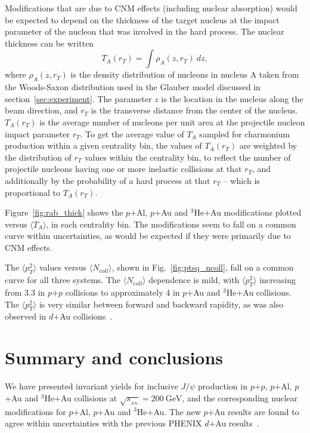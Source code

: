 \documentclass[twocolumn,letterpaper,aps,prc,longbibliography,superscriptaddress,nofootinbib,floatfix]{revtex4-1}
\newcommand{\meanncoll}{\mbox{$\langle N_{\mathrm coll} \rangle$}\xspace}
\newcommand{\meanptsq}{\mbox{$\langle p_T^2 \rangle$}\xspace}
\newcommand{\sqsntwo}{\mbox{$\sqrt{s_{_{NN}}}=200~\mathrm{GeV}$}\xspace}
\newcommand{\pp}{\mbox{$p$$+$$p$}\xspace}
\newcommand{\dau}{\mbox{$d$$+$Au}\xspace}
\newcommand{\pau}{\mbox{$p$$+$Au}\xspace}
\newcommand{\pal}{\mbox{$p$$+$Al}\xspace}
\newcommand{\heau}{\mbox{$^{3}$He$+$Au}\xspace}
\newcommand{\jpsi}{\mbox{$J/\psi$}\xspace}
\begin{document}
Modifications that are due to CNM effects (including nuclear absorption) 
would be expected to depend on the thickness of the target nucleus at 
the impact parameter of the nucleon that was involved in the hard 
process. The nuclear thickness can be written
\begin{equation}
    T_{A}(r_{T}) = \int  \rho_{A}(z, r_{T}) ~ dz,
\end{equation}
where $\rho_A(z, r_T)$ is the density distribution of nucleons in 
nucleus A taken from the Woods-Saxon distribution used in the Glauber 
model discussed in section~\ref{sec:experiment}. The parameter $z$ is 
the location in the nucleus along the beam direction, and $r_T$ is the 
transverse distance from the center of the nucleus. $T_A(r_T)$ is the 
average number of nucleons per unit area at the projectile nucleon 
impact parameter $r_T$. To get the average value of $T_A$ sampled for 
charmonium production within a given centrality bin, the values of 
$T_A(r_T)$ are weighted by the distribution of $r_T$ values within the 
centrality bin, to reflect the number of projectile nucleons having one 
or more inelastic collisions at that $r_T$, and additionally by the 
probability of a hard process at that $r_T$ -- which is proportional to 
$T_A(r_T)$.

Figure~\ref{fig:rab_thick} shows the \pal, \pau and \heau modifications 
plotted versus $\langle T_{A}\rangle$, in each centrality bin. The 
modifications seem to fall on a common curve within uncertainties, as 
would be expected if they were primarily due to CNM effects.

The \meanptsq values versus \meanncoll, shown in 
Fig.~\ref{fig:ptsq_ncoll}, fall on a common curve for all three systems. 
The \meanncoll dependence is mild, with \meanptsq increasing from 3.3 in 
\pp collisions to approximately 4 in \pau and \heau collisions. The 
\meanptsq is very similar between forward and backward rapidity, as was 
also observed in \dau collisions~\cite{Adare:2012qf}.

\section{Summary and conclusions}

We have presented invariant yields for inclusive \jpsi production in 
\pp, \pal, \pau and \heau collisions at \sqsntwo, and the corresponding 
nuclear modifications for \pal, \pau and \heau. The new \pau results are 
found to agree within uncertainties with the previous PHENIX \dau 
results~\cite{Adare:2013lkk}.
\end{document}
